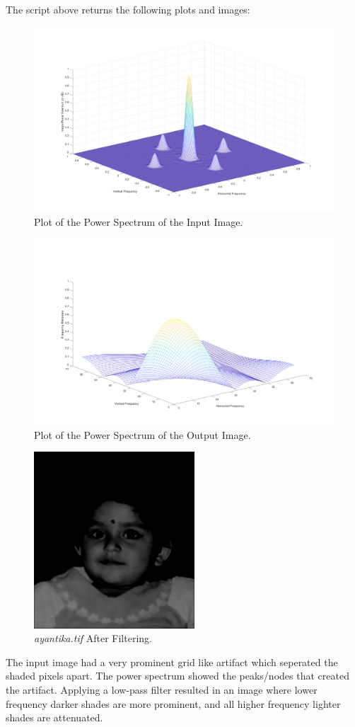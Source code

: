 \documentclass[a4paper, 10pt]{article}
\begin{document}
The script above returns the following plots and images:
\begin{figure}[H]
  \centering
  \includegraphics[width=16cm]{images/q4_b1.png}
  \caption{Plot of the Power Spectrum of the Input Image.}
\end{figure}
\begin{figure}[H]
  \centering
  \includegraphics[width=16cm]{images/q4_b2.png}
  \caption{Plot of the Power Spectrum of the Output Image.}
\end{figure}
\begin{figure}[H]
  \centering
  \includegraphics[width=6cm]{images/q4_ayantika_filt.png}
  \caption{\textit{ayantika.tif} After Filtering.}
\end{figure}
\noindent The input image had a very prominent grid like artifact which seperated the shaded pixels apart. The power spectrum showed 
the peaks/nodes that created the artifact. Applying a low-pass filter resulted in an image where lower frequency darker
shades are more prominent, and all higher frequency lighter shades are attenuated.
\end{document}
